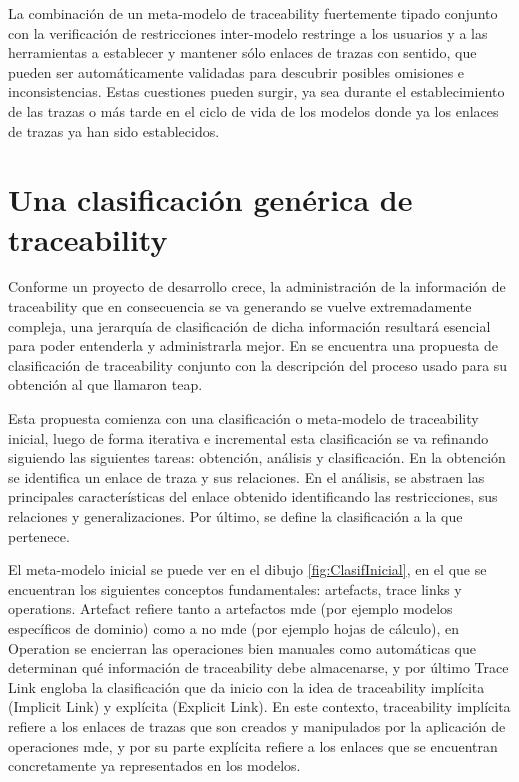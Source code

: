 \documentclass[a4paper,12pt,oneside,spanish]{book}
\begin{document}
La combinación de un meta-modelo de traceability fuertemente tipado conjunto con la verificación de restricciones inter-modelo restringe a los usuarios y a las herramientas a establecer y mantener sólo enlaces de trazas con sentido, que pueden ser automáticamente validadas para descubrir posibles omisiones e inconsistencias. Estas cuestiones pueden surgir, ya sea durante el establecimiento de las trazas o más tarde en el ciclo de vida de los modelos donde ya los enlaces de trazas ya han sido establecidos.

\section{Una clasificación genérica de traceability}
\label{sec:ClasificacionTraceability}

Conforme un proyecto de desarrollo crece, la administración de la información de traceability que en consecuencia se va generando se vuelve extremadamente compleja, una jerarquía de clasificación de dicha información resultará esencial para poder entenderla y administrarla mejor. En \cite{PaigeOlsenKolovosZschalerPower} se encuentra una propuesta de clasificación de traceability conjunto con la descripción del proceso usado para su obtención al que llamaron \gls{teap}.

Esta propuesta comienza con una clasificación o meta-modelo de traceability inicial, luego de forma iterativa e incremental esta clasificación se va refinando siguiendo las siguientes tareas: obtención, análisis y clasificación. En la obtención se identifica un enlace de traza y sus relaciones. En el análisis, se abstraen las principales características del enlace obtenido identificando las restricciones, sus relaciones y generalizaciones. Por último, se define la clasificación a la que pertenece.

El meta-modelo inicial se puede ver en el dibujo \ref{fig:ClasifInicial}, en el que se encuentran los siguientes conceptos fundamentales: artefacts, trace links y operations. Artefact refiere tanto a artefactos \gls{mde} (por ejemplo modelos específicos de dominio) como a no \gls{mde} (por ejemplo hojas de cálculo), en Operation se encierran las operaciones bien manuales como automáticas que determinan qué información de traceability debe almacenarse, y por último Trace Link engloba la clasificación que da inicio con la idea de traceability implícita (Implicit Link) y explícita (Explicit Link). En este contexto, traceability implícita refiere a los enlaces de trazas que son creados y manipulados por la aplicación de operaciones \gls{mde}, y por su parte explícita refiere a los enlaces que se encuentran concretamente ya representados en los modelos.
\end{document}
